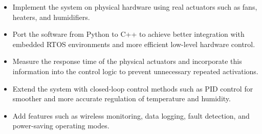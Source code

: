 \begin{itemize}
  \item Implement the system on physical hardware using real actuators such as fans, heaters, and humidifiers.
  \item Port the software from Python to C++ to achieve better integration with embedded RTOS environments and more efficient
        low-level hardware control.
  \item Measure the response time of the physical actuators and incorporate this information into the control logic to prevent
        unnecessary repeated activations.
  \item Extend the system with closed-loop control methods such as PID control for smoother and more accurate regulation of
        temperature and humidity.
  \item Add features such as wireless monitoring, data logging, fault detection, and power-saving operating modes.
\end{itemize}